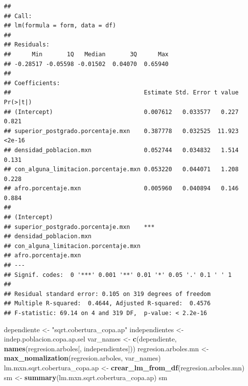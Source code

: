 \documentclass[12pt,]{book}
\newenvironment{Shaded}{\begin{snugshade}}{\end{snugshade}}
\newcommand{\KeywordTok}[1]{\textcolor[rgb]{0.13,0.29,0.53}{\textbf{#1}}}
\newcommand{\StringTok}[1]{\textcolor[rgb]{0.31,0.60,0.02}{#1}}
\newcommand{\NormalTok}[1]{#1}
\begin{document}
\begin{verbatim}
## 
## Call:
## lm(formula = form, data = df)
## 
## Residuals:
##      Min       1Q   Median       3Q      Max 
## -0.28517 -0.05598 -0.01502  0.04070  0.65940 
## 
## Coefficients:
##                                      Estimate Std. Error t value Pr(>|t|)
## (Intercept)                          0.007612   0.033577   0.227    0.821
## superior_postgrado.porcentaje.mxn    0.387778   0.032525  11.923   <2e-16
## densidad_poblacion.mxn               0.052744   0.034832   1.514    0.131
## con_alguna_limitacion.porcentaje.mxn 0.053220   0.044071   1.208    0.228
## afro.porcentaje.mxn                  0.005960   0.040894   0.146    0.884
##                                         
## (Intercept)                             
## superior_postgrado.porcentaje.mxn    ***
## densidad_poblacion.mxn                  
## con_alguna_limitacion.porcentaje.mxn    
## afro.porcentaje.mxn                     
## ---
## Signif. codes:  0 '***' 0.001 '**' 0.01 '*' 0.05 '.' 0.1 ' ' 1
## 
## Residual standard error: 0.105 on 319 degrees of freedom
## Multiple R-squared:  0.4644, Adjusted R-squared:  0.4576 
## F-statistic: 69.14 on 4 and 319 DF,  p-value: < 2.2e-16
\end{verbatim}

\begin{Shaded}
\begin{Highlighting}[]
\NormalTok{dependiente <-}\StringTok{ "sqrt.cobertura_copa.ap"}
\NormalTok{independientes <-}\StringTok{ }\NormalTok{indep.poblacion.copa.ap.sel}
\NormalTok{var_names <-}\StringTok{ }\KeywordTok{c}\NormalTok{(dependiente, }\KeywordTok{names}\NormalTok{(regresion.arboles[, independientes]))}
\NormalTok{regresion.arboles.mn <-}\StringTok{ }\KeywordTok{max_nomalization}\NormalTok{(regresion.arboles, var_names)}
\NormalTok{lm.mxn.sqrt.cobertura_copa.ap <-}\StringTok{ }\KeywordTok{crear_lm_from_df}\NormalTok{(regresion.arboles.mn)}
\NormalTok{sm <-}\StringTok{ }\KeywordTok{summary}\NormalTok{(lm.mxn.sqrt.cobertura_copa.ap)}
\NormalTok{sm}
\end{Highlighting}
\end{Shaded}
\end{document}
